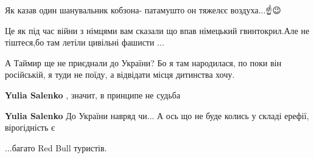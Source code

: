 \begin{itemize}
Як казав один шанувальник кобзона- патамушто он тяжелєє воздуха...☝😉

 
Це як під час війни з німцями вам сказали що впав німецький гвинтокрил.Але не тіштеся,бо там летіли цивільні фашисти ...

 
А Таймир ще не приєднали до України? Бо я там народилася, по поки він російській, я туди не поїду, а відвідати місця дитинства хочу.

\begin{itemize}
 
\textbf{Yulia Salenko} , значит, в принципе не судьба

 
\textbf{Yulia Salenko} До України навряд чи... А ось що не буде колись у складі ерефії, вірогідність є
\end{itemize}

 
...багато Red Bull туристів.

 

\end{itemize}

